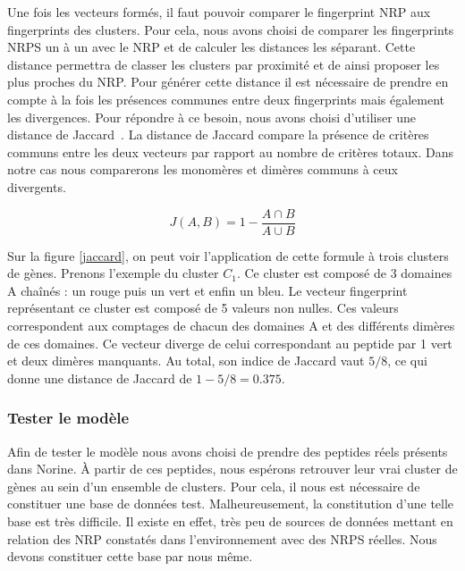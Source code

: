 
Une fois les vecteurs formés, il faut pouvoir comparer le fingerprint NRP aux fingerprints des clusters.
Pour cela, nous avons choisi de comparer les fingerprints NRPS un à un avec le NRP et de calculer les distances les séparant.
Cette distance permettra de classer les clusters par proximité et de ainsi proposer les plus proches du NRP.
Pour générer cette distance il est nécessaire de prendre en compte à la fois les présences communes entre deux fingerprints mais également les divergences.
Pour répondre à ce besoin, nous avons choisi d'utiliser une distance de Jaccard~\cite{jaccard_etude_1901}.
La distance de Jaccard compare la présence de critères communs entre les deux vecteurs par rapport au nombre de critères totaux.
Dans notre cas nous comparerons les monomères et dimères communs à ceux divergents.

\begin{equation}
  J(A,B) = 1 - \frac{A \cap B}{A \cup B}
\end{equation}

Sur la figure \ref{jaccard}, on peut voir l'application de cette formule à trois clusters de gènes.
Prenons l'exemple du cluster $C_1$.
Ce cluster est composé de 3 domaines A chaînés : un rouge puis un vert et enfin un bleu.
Le vecteur fingerprint représentant ce cluster est composé de 5 valeurs non nulles.
Ces valeurs correspondent aux comptages de chacun des domaines A et des différents dimères de ces domaines.
Ce vecteur diverge de celui correspondant au peptide par 1 vert et deux dimères manquants.
Au total, son indice de Jaccard vaut $5 / 8$, ce qui donne une distance de Jaccard de $1 - 5/8 = 0.375$.





\subsubsection{Tester le modèle}

Afin de tester le modèle nous avons choisi de prendre des peptides réels présents dans Norine.
À partir de ces peptides, nous espérons retrouver leur vrai cluster de gènes au sein d'un ensemble de clusters.
Pour cela, il nous est nécessaire de constituer une base de données test.
Malheureusement, la constitution d'une telle base est très difficile.
Il existe en effet, très peu de sources de données mettant en relation des NRP constatés dans l'environnement avec des NRPS réelles.
Nous devons constituer cette base par nous même.


